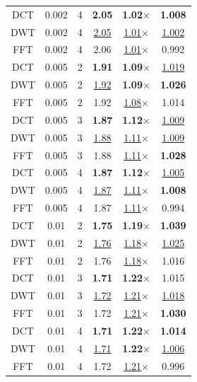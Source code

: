 \begin{table}[t!]
\begin{tiny}
\begin{tabular}{cccccc}
        \midrule
        DCT & 0.002 & 4 & \textbf{2.05} & \textbf{1.02$\times$} & \textbf{1.008} \\
        DWT & 0.002 & 4 & \underline{2.05} & \underline{1.01$\times$} & \underline{1.002} \\
        FFT & 0.002 & 4 & 2.06 & \underline{1.01$\times$} & 0.992 \\
        \midrule
        DCT & 0.005 & 2 & \textbf{1.91} & \textbf{1.09$\times$} & \underline{1.019} \\
        DWT & 0.005 & 2 & \underline{1.92} & \textbf{1.09$\times$} & \textbf{1.026} \\
        FFT & 0.005 & 2 & 1.92 & \underline{1.08$\times$} & 1.014 \\
        \midrule
        DCT & 0.005 & 3 & \textbf{1.87} & \textbf{1.12$\times$} & \underline{1.009} \\
        DWT & 0.005 & 3 & \underline{1.88} & \underline{1.11$\times$} & \underline{1.009} \\
        FFT & 0.005 & 3 & 1.88 & \underline{1.11$\times$} & \textbf{1.028} \\
        \midrule
        DCT & 0.005 & 4 & \textbf{1.87} & \textbf{1.12$\times$} & \underline{1.005} \\
        DWT & 0.005 & 4 & \underline{1.87} & \underline{1.11$\times$} & \textbf{1.008} \\
        FFT & 0.005 & 4 & 1.87 & \underline{1.11$\times$} & 0.994 \\
        \midrule
        DCT & 0.01 & 2 & \textbf{1.75} & \textbf{1.19$\times$} & \textbf{1.039} \\
        DWT & 0.01 & 2 & \underline{1.76} & \underline{1.18$\times$} & \underline{1.025} \\
        FFT & 0.01 & 2 & 1.76 & \underline{1.18$\times$} & 1.016 \\
        \midrule
        DCT & 0.01 & 3 & \textbf{1.71} & \textbf{1.22$\times$} & 1.015 \\
        DWT & 0.01 & 3 & \underline{1.72} & \underline{1.21$\times$} & \underline{1.018} \\
        FFT & 0.01 & 3 & 1.72 & \underline{1.21$\times$} & \textbf{1.030} \\
        \midrule
        DCT & 0.01 & 4 & \textbf{1.71} & \textbf{1.22$\times$} & \textbf{1.014} \\
        DWT & 0.01 & 4 & \underline{1.71} & \textbf{1.22$\times$} & \underline{1.006} \\
        FFT & 0.01 & 4 & 1.72 & \underline{1.21$\times$} & 0.996 \\

\end{tabular}
\end{tiny}
\end{table}
